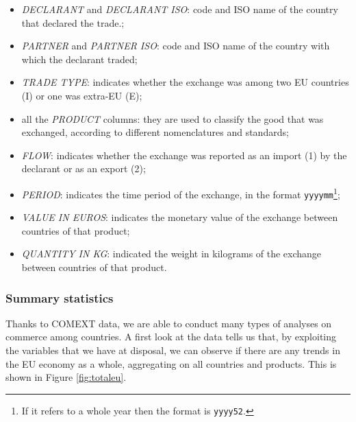 \begin{itemize}
    \item \textit{DECLARANT} and \textit{DECLARANT ISO}: code and ISO name of the country that declared the trade.;
    \item \textit{PARTNER} and \textit{PARTNER ISO}: code and ISO name of the country with which the declarant traded;
    \item \textit{TRADE TYPE}: indicates whether the exchange was among two EU countries (I) or one was extra-EU (E);
    \item all the \textit{PRODUCT} columns: they are used to classify the good that was exchanged, according to different nomenclatures and standards;
    \item \textit{FLOW}: indicates whether the exchange was reported as an import (1) by the declarant or as an export (2);
    \item \textit{PERIOD}: indicates the time period of the exchange, in the format \texttt{yyyymm}\footnote{If it refers to a whole year then the format is \texttt{yyyy52}.};
    \item \textit{VALUE IN EUROS}: indicates the monetary value of the exchange between countries of that product;
    \item \textit{QUANTITY IN KG}: indicated the weight in kilograms of the exchange between countries of that product.
\end{itemize}



\subsubsection{Summary statistics}
Thanks to COMEXT data, we are able to conduct many types of analyses on commerce among countries. A first look at the data tells us that, by exploiting the variables that we have at disposal, we can observe if there are any trends in the EU economy as a whole, aggregating on all countries and products. This is shown in Figure \ref{fig:totaleu}. 

